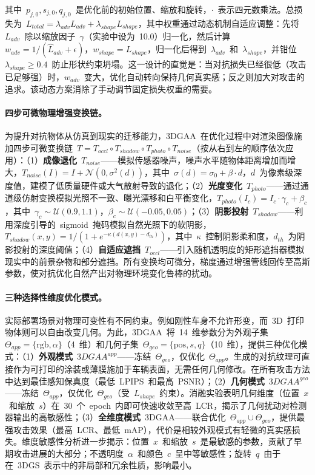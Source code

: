 其中~$p_{j,0}, s_{j,0}, q_{j,0}$~是优化前的初始位置、缩放和旋转，$\cdot$~表示四元数乘法。总损失为~$L_{total} = \lambda_{adv} L_{adv} + \lambda_{shape} L_{shape}$，其中权重通过动态机制自适应调整：先将~$L_{adv}$~除以缩放因子~$\gamma$（实验中设为~10.0）归一化，然后计算~$w_{adv} = 1/(\hat{L}_{adv} + \epsilon)$，$w_{shape} = L_{shape}$，归一化后得到~$\lambda_{adv}$~和~$\lambda_{shape}$，并钳位~$\lambda_{shape} \geq 0.4$~防止形状约束坍塌。这一设计的直觉是：当对抗损失已经很低（攻击已足够强）时，$w_{adv}$~变大，优化自动转向保持几何真实感；反之则加大对攻击的追求。该动态方案消除了手动调节固定损失权重的需要。

\paragraph{四步可微物理增强变换链。}
为提升对抗物体从仿真到现实的迁移能力，3DGAA~在优化过程中对渲染图像施加四步可微变换链~$T = T_{occl} \circ T_{shadow} \circ T_{photo} \circ T_{noise}$（按从右到左的顺序依次应用）：（1）\textbf{成像退化}~$T_{noise}$——模拟传感器噪声，噪声水平随物体距离增加而增大，$T_{noise}(I) = I + \mathcal{N}(0, \sigma^2(d))$，其中~$\sigma(d) = \sigma_0 + \beta \cdot d$，$d$~为像素级深度值，建模了低质量硬件或大气散射导致的退化；（2）\textbf{光度变化}~$T_{photo}$——通过通道级仿射变换模拟光照不一致、曝光漂移和白平衡变化，$T_{photo}(I_c) = I_c \cdot \gamma_c + \beta_c$，其中~$\gamma_c \sim \mathcal{U}(0.9, 1.1)$，$\beta_c \sim \mathcal{U}(-0.05, 0.05)$；（3）\textbf{阴影投射}~$T_{shadow}$——利用深度引导的~sigmoid~掩码模拟自然光照下的软阴影，$T_{shadow}(x,y) = 1 / (1 + e^{-\kappa(d(x,y) - d_{th})})$，其中~$\kappa$~控制阴影柔和度，$d_{th}$~为阴影投射的深度阈值；（4）\textbf{自适应遮挡}~$T_{occl}$——引入随机透明度的矩形遮挡器模拟现实中的前景杂物和部分遮挡。所有变换均可微分，梯度通过增强管线回传至高斯参数，使对抗优化自然产出对物理环境变化鲁棒的扰动。

\paragraph{三种选择性维度优化模式。}
实际部署场景对物理可变性有不同约束。例如刚性车身不允许形变，而~3D~打印物体则可以自由改变几何。为此，3DGAA~将~14~维参数分为外观子集~$\Theta_{app} = \{\text{rgb}, \alpha\}$（4~维）和几何子集~$\Theta_{geo} = \{\text{pos}, s, q\}$（10~维），提供三种优化模式：（1）\textbf{外观模式}~$3DGAA^{app}$——冻结~$\Theta_{geo}$，仅优化~$\Theta_{app}$。生成的对抗纹理可直接作为可打印的涂装或薄膜施加于车辆表面，无需任何几何修改。在所有攻击方法中达到最佳感知保真度（最低~LPIPS~和最高~PSNR）；（2）\textbf{几何模式}~$3DGAA^{geo}$——冻结~$\Theta_{app}$，仅优化~$\Theta_{geo}$（受~$L_{shape}$~约束）。消融实验表明几何维度（位置~$x$~和缩放~$s$）在~30~个~epoch~内即可快速收敛至高~LCR，揭示了几何扰动对检测器输出的高敏感性；（3）\textbf{全维度模式}~3DGAA——联合优化~$\Theta_{app} \cup \Theta_{geo}$，提供最强攻击效果（最高~LCR、最低~mAP），代价是相较外观模式有轻微的真实感损失。维度敏感性分析进一步揭示：位置~$x$~和缩放~$s$~是最敏感的参数，贡献了早期攻击进展的大部分；不透明度~$\alpha$~和颜色~$c$~呈中等敏感性；旋转~$q$~由于在~3DGS~表示中的非局部和冗余性质，影响最小。

